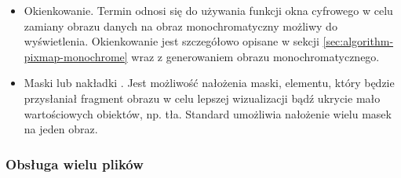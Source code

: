 \begin{itemize}
    \item Okienkowanie.
          Termin odnosi się do używania funkcji okna cyfrowego w celu zamiany obrazu danych na obraz monochromatyczny możliwy do wyświetlenia.
          Okienkowanie jest szczegółowo opisane w sekcji \ref{sec:algorithm-pixmap-monochrome} wraz z generowaniem obrazu monochromatycznego.

    \item Maski lub nakładki .
          Jest możliwość nałożenia maski, elementu, który będzie przysłaniał fragment obrazu w celu lepszej wizualizacji bądź ukrycie mało wartościowych obiektów, np. tła.
          Standard \DICOM umożliwia nałożenie wielu masek na jeden obraz.
\end{itemize}

\subsubsection{Obsługa wielu plików}

